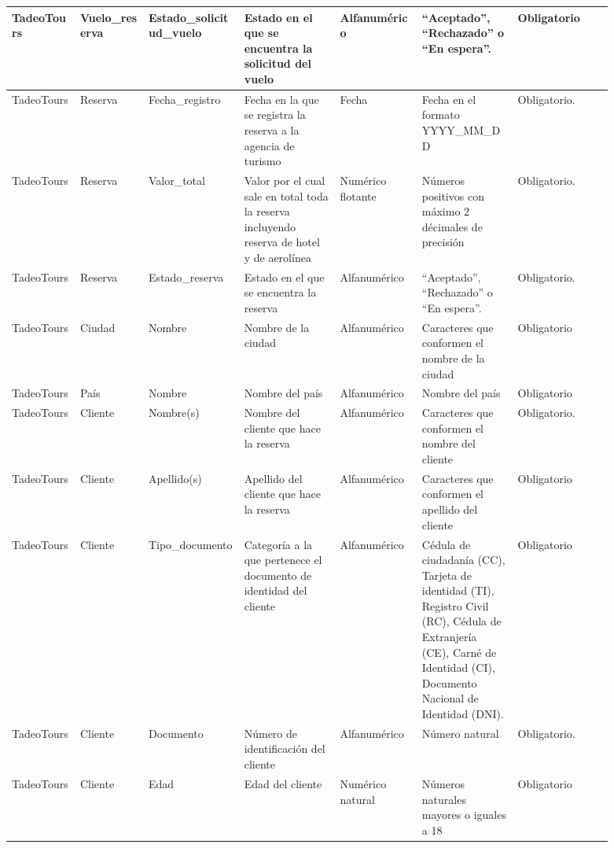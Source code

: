 \documentclass{article}
\begin{document}
\begin{landscape}
\begin{longtable}{|C{0.102\linewidth}|C{0.102\linewidth}|C{0.142\linewidth}|C{0.142\linewidth}|C{0.122\linewidth}|C{0.142\linewidth}|C{0.142\linewidth}|}
TadeoTours & Vuelo\_reserva & Estado\_solicitud\_vuelo & Estado en el que se encuentra la solicitud del vuelo & Alfanumérico & ``Aceptado'', ``Rechazado'' o ``En espera''. & Obligatorio \\ \hline

TadeoTours & Reserva & Fecha\_registro & Fecha en la que se registra la reserva a la agencia de turismo & Fecha & Fecha en el formato YYYY\_MM\_DD & Obligatorio. \\ \hline

TadeoTours & Reserva & Valor\_total & Valor por el cual sale en total toda la reserva incluyendo reserva de hotel y de aerolínea & Numérico flotante & Números positivos con máximo 2 décimales de precisión & Obligatorio. \\ \hline

TadeoTours & Reserva & Estado\_reserva & Estado en el que se encuentra la reserva & Alfanumérico & ``Aceptado'', ``Rechazado'' o ``En espera''. & Obligatorio. \\ \hline

TadeoTours & Ciudad & Nombre & Nombre de la ciudad & Alfanumérico & Caracteres que conformen el nombre de la ciudad & Obligatorio \\ \hline

TadeoTours & País & Nombre & Nombre del país & Alfanumérico & Nombre del país & Obligatorio \\ \hline

TadeoTours & Cliente & Nombre(s) & Nombre del cliente que hace la reserva & Alfanumérico & Caracteres que conformen el nombre del cliente & Obligatorio. \\ \hline

TadeoTours & Cliente & Apellido(s) & Apellido del cliente que hace la reserva & Alfanumérico & Caracteres que conformen el apellido del cliente & Obligatorio \\ \hline

TadeoTours & Cliente & Tipo\_documento & Categoría a la que pertenece el documento de identidad del cliente & Alfanumérico & Cédula de ciudadanía (CC), Tarjeta de identidad (TI), Registro Civil (RC), Cédula de Extranjería (CE), Carné de Identidad (CI), Documento Nacional de Identidad (DNI). & Obligatorio \\ \hline

TadeoTours & Cliente & Documento & Número de identificación del cliente & Alfanumérico & Número natural & Obligatorio. \\ \hline

TadeoTours & Cliente & Edad & Edad del cliente & Numérico natural & Números naturales mayores o iguales a 18 & Obligatorio \\ \hline


\end{longtable}
\end{landscape}
\end{document}
